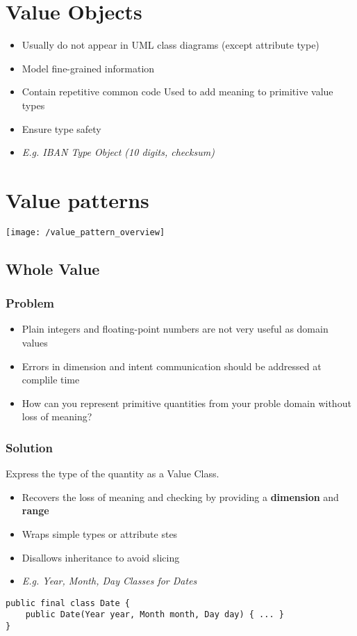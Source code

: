 \section{Value Objects}
\begin{itemize}[topsep=0pt]
    \itemsep -0.4em
    \item Usually do not appear in UML class diagrams (except attribute type)
    \item Model fine-grained information
    \item Contain repetitive common code
    \SubItem Used to add meaning to primitive value types
    \item Ensure type safety
    \item \textit{E.g. IBAN Type Object (10 digits, checksum)}
\end{itemize}

\section{Value patterns}
\texttt{[image: /value\_pattern\_overview]}

\subsection{Whole Value}
\subsubsection{Problem}
\begin{itemize}[topsep=0pt]
    \itemsep -0.4em
    \item Plain integers and floating-point numbers are not very useful as domain values
    \item Errors in dimension and intent communication should be addressed at complile time
    \item How can you represent primitive quantities from your proble domain without loss of meaning?
\end{itemize}
\subsubsection{Solution}
Express the type of the quantity as a Value Class.
\begin{itemize}[topsep=0pt]
    \itemsep -0.4em
    \item Recovers the loss of meaning and checking by providing a \textbf{dimension} and \textbf{range}
    \item Wraps simple types or attribute stes
    \item Disallows inheritance to avoid slicing
    \item \textit{E.g. Year, Month, Day Classes for Dates}
\end{itemize}
\begin{lstlisting}[style=htmlcssjs]
public final class Date {
    public Date(Year year, Month month, Day day) { ... }
}
\end{lstlisting}

